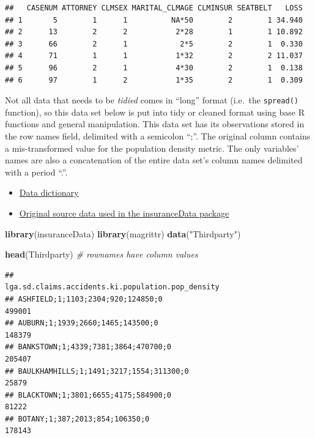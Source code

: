 \documentclass[]{book}
\newenvironment{Shaded}{\begin{snugshade}}{\end{snugshade}}
\newcommand{\KeywordTok}[1]{\textcolor[rgb]{0.13,0.29,0.53}{\textbf{{#1}}}}
\newcommand{\StringTok}[1]{\textcolor[rgb]{0.31,0.60,0.02}{{#1}}}
\newcommand{\CommentTok}[1]{\textcolor[rgb]{0.56,0.35,0.01}{\textit{{#1}}}}
\newcommand{\NormalTok}[1]{{#1}}
\providecommand{\tightlist}{%
  \setlength{\itemsep}{0pt}\setlength{\parskip}{0pt}}
\begin{document}
\begin{verbatim}
##   CASENUM ATTORNEY CLMSEX MARITAL_CLMAGE CLMINSUR SEATBELT   LOSS
## 1       5        1      1          NA*50        2        1 34.940
## 2      13        2      2           2*28        1        1 10.892
## 3      66        2      1            2*5        2        1  0.330
## 4      71        1      1           1*32        2        2 11.037
## 5      96        2      1           4*30        2        1  0.138
## 6      97        1      2           1*35        2        1  0.309
\end{verbatim}

Not all data that needs to be \emph{tidied} comes in ``long'' format
(i.e.~the \texttt{spread()} function), so this data set below is put
into tidy or cleaned format using base R functions and general
manipulation. This data set has its observations stored in the row names
field, delimited with a semicolon ``;''. The original column contains a
mis-transformed value for the population density metric. The only
variables' names are also a concatenation of the entire data set's
column names delimited with a period ``.''.

\begin{itemize}
\tightlist
\item
  \href{http://www.businessandeconomics.mq.edu.au/our_departments/Applied_Finance_and_Actuarial_Studies/acst_docs/glms_for_insurance_data/data/third_party_claims.txt}{Data
  dictionary}
\item
  \href{http://www.businessandeconomics.mq.edu.au/our_departments/Applied_Finance_and_Actuarial_Studies/acst_docs/glms_for_insurance_data/data/Third_party_claims.xls}{Original
  source data used in the insuranceData package}
\end{itemize}

\begin{Shaded}
\begin{Highlighting}[]
\KeywordTok{library}\NormalTok{(insuranceData)}
\KeywordTok{library}\NormalTok{(magrittr)}
\KeywordTok{data}\NormalTok{(}\StringTok{"Thirdparty"}\NormalTok{)}

\KeywordTok{head}\NormalTok{(Thirdparty) }\CommentTok{# rownames have column values}
\end{Highlighting}
\end{Shaded}

\begin{verbatim}
##                                         lga.sd.claims.accidents.ki.population.pop_density
## ASHFIELD;1;1103;2304;920;124850;0                                                  499001
## AUBURN;1;1939;2660;1465;143500;0                                                   148379
## BANKSTOWN;1;4339;7381;3864;470700;0                                                205407
## BAULKHAMHILLS;1;1491;3217;1554;311300;0                                             25879
## BLACKTOWN;1;3801;6655;4175;584900;0                                                 81222
## BOTANY;1;387;2013;854;106350;0                                                     178143
\end{verbatim}
\end{document}

